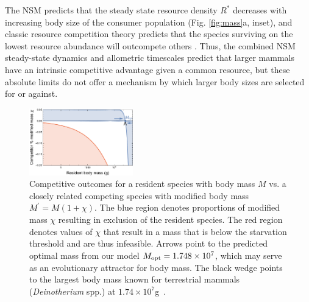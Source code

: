 \documentclass[twocolumn,preprintnumbers,amsmath,amssymb,superscriptaddress]{revtex4}
\begin{document}
The NSM predicts that the steady state resource density $R^{*}$ decreases with increasing body size of the consumer population (Fig. \ref{fig:mass}a, inset), and classic resource competition theory predicts that the species surviving on the lowest resource abundance will outcompete others \citep{tilman1981,dutkiewicz2009,barton2010}. Thus, the combined NSM steady-state dynamics and allometric timescales predict that larger mammals have an intrinsic competitive advantage given a common resource, but these absolute limits do not offer a mechanism by which larger body sizes are selected for or against.

\begin{figure}
\centering
\includegraphics[width=0.4\textwidth]{fig_Invasion.eps}
\caption{\small{Competitive outcomes for a resident species with body mass $M$ vs. a closely related competing species with modified body mass $M^\prime=M(1+\chi)$.  
The blue region denotes proportions of modified mass $\chi$ resulting in exclusion of the resident species. 
The red region denotes values of $\chi$ that result in a mass that is below the starvation threshold and are thus infeasible. 
Arrows point to the predicted optimal mass from our model $M_{\rm opt}=1.748\times 10^7$, which may serve as an evolutionary attractor for body mass.
The black wedge points to the largest body mass known for terrestrial mammals (\emph{Deinotherium} spp.) at $1.74\times10^7$g~\citep{Smith:2010p3442}.}\label{fig:invasion}}
\end{figure}



\end{document}
